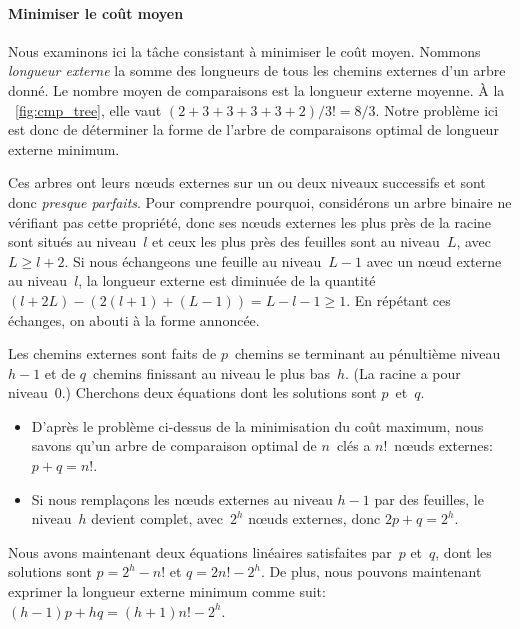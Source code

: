 \paragraph{Minimiser le coût moyen}
\label{par:opt_sort_minimean}

Nous examinons ici la tâche consistant à minimiser le coût
moyen. Nommons \emph{longueur
  externe}\label{sorting__external_path_length}  la somme des longueurs de tous les chemins
externes d'un arbre donné. Le nombre moyen de comparaisons est la
longueur externe moyenne. À la \fig~\vref{fig:cmp_tree}, elle vaut
\((2+3+3+3+3+2)/3!=8/3\). Notre problème ici est donc de déterminer la
forme de l'arbre de comparaisons optimal de longueur externe minimum.

Ces arbres ont leurs n{\oe}uds externes sur un ou deux niveaux
successifs et sont donc \emph{presque parfaits}. Pour comprendre pourquoi,
considérons un arbre binaire ne vérifiant pas cette propriété, donc
ses n{\oe}uds externes les plus près de la racine sont situés au
niveau~\(l\) et ceux les plus près des feuilles sont au niveau~\(L\),
avec \(L \geqslant l + 2\). Si nous échangeons une feuille au
niveau~\(L-1\) avec un n{\oe}ud externe au niveau~\(l\), la longueur
externe est diminuée de la quantité \((l+2L) - (2(l+1) + (L-1)) = L -
l - 1 \geqslant 1\). En répétant ces échanges, on abouti à la forme
annoncée.

Les chemins externes sont faits de \(p\)~chemins se terminant au
pénultième niveau~\(h-1\) et de \(q\)~chemins finissant au niveau le
plus bas~\(h\). (La racine a pour niveau~\(0\).) Cherchons deux
équations dont les solutions sont \(p\)~et~\(q\).
\begin{itemize}

  \item D'après le problème ci-dessus de la minimisation du coût
    maximum, nous savons qu'un arbre de comparaison optimal de
    \(n\)~clés a \(n!\)~n{\oe}uds externes: \(p+q=n!\).

  \item Si nous remplaçons les n{\oe}uds externes au niveau \(h-1\)
    par des feuilles, le niveau~\(h\) devient complet, avec~\(2^h\)
    n{\oe}uds externes, donc \(2p+q=2^h\).

\end{itemize}
Nous avons maintenant deux équations linéaires satisfaites par~\(p\)
et~\(q\), dont les solutions sont \(p=2^h-n!\) et \(q=2n!-2^h\). De
plus, nous pouvons maintenant exprimer la longueur externe minimum
comme suit: \((h-1)p + hq = (h+1)n! - 2^h\).

